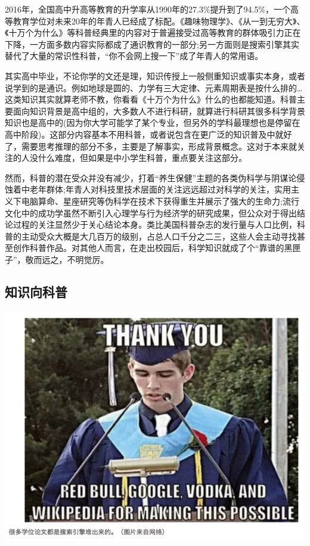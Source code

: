 \documentclass[]{book}
\begin{document}
2016年，全国高中升高等教育的升学率从1990年的27.3\%提升到了94.5\%，一个高等教育学位对未来20年的年青人已经成了标配。《趣味物理学》、《从一到无穷大》、《十万个为什么》等科普经典里的内容对于普遍接受过高等教育的群体吸引力正在下降，一方面多数内容实际都成了通识教育的一部分;另一方面则是搜索引擎其实替代了大量的常识性科普，``你不会网上搜一下''成了年青人的常用语。

其实高中毕业，不论你学的文还是理，知识传授上一般侧重知识或事实本身，或者说学到的是通识。例如地球是圆的、力学有三大定律、元素周期表是按什么排的\ldots{}这类知识其实就算老师不教，你看看《十万个为什么》什么的也都能知道。科普主要面向知识背景是高中组的，大多数人不进行科研，就算进行科研其很多科学背景知识也是高中的(因为你大学可能学了某个专业，但另外的学科最理想也是停留在高中阶段)。这部分内容基本不用科普，或者说包含在更广泛的知识普及中就好了，需要思考推理的部分不多，主要是了解事实，形成背景概念。这对于本来就关注的人没什么难度，但如果是中小学生科普，重点要关注这部分。

然而，科普的潜在受众并没有减少，打着``养生保健''主题的各类伪科学与阴谋论侵蚀着中老年群体;年青人对科技里技术层面的关注远远超过对科学的关注，实用主义下电脑算命、星座研究等伪科学在技术下获得重生并展示了强大的生命力;流行文化中的成功学虽然不断引入心理学与行为经济学的研究成果，但公众对于得出结论过程的关注显然少于关心结论本身。类比美国科普杂志的发行量与人口比例，科普的主动受众大概是大几百万的级别，占总人口千分之二三，这些人会主动寻找甚至创作科普作品。对其他人而言，在走出校园后，科学知识就成了个``靠谱的黑匣子''，敬而远之，不明觉厉。

\subsection{知识向科普}

\includegraphics[width=8.33in]{images/pops3}
\end{document}
